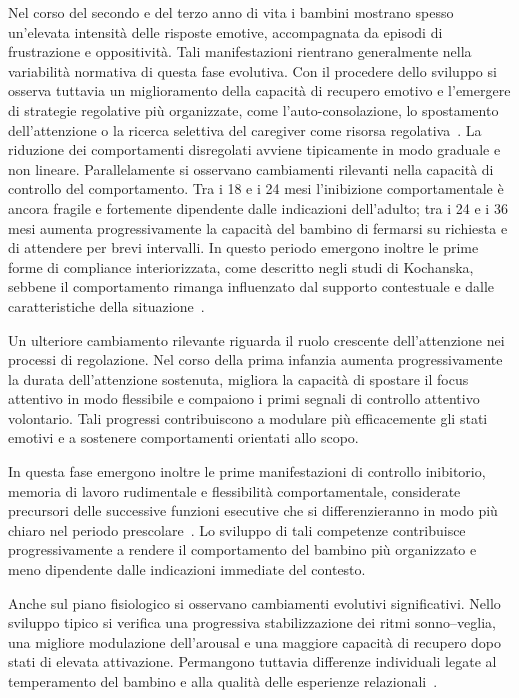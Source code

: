             Nel corso del secondo e del terzo anno di vita i bambini mostrano spesso un'elevata intensità delle risposte emotive, accompagnata da episodi di frustrazione e oppositività. Tali manifestazioni rientrano generalmente nella variabilità normativa di questa fase evolutiva. Con il procedere dello sviluppo si osserva tuttavia un miglioramento della capacità di recupero emotivo e l'emergere di strategie regolative più organizzate, come l'auto-consolazione, lo spostamento dell'attenzione o la ricerca selettiva del caregiver come risorsa regolativa~\cite{calkins2007,calkins2011,eisenberg2010}. La riduzione dei comportamenti disregolati avviene tipicamente in modo graduale e non lineare. Parallelamente si osservano cambiamenti rilevanti nella capacità di controllo del comportamento. Tra i 18 e i 24 mesi l'inibizione comportamentale è ancora fragile e fortemente dipendente dalle indicazioni dell'adulto; tra i 24 e i 36 mesi aumenta progressivamente la capacità del bambino di fermarsi su richiesta e di attendere per brevi intervalli. In questo periodo emergono inoltre le prime forme di compliance interiorizzata, come descritto negli studi di Kochanska, sebbene il comportamento rimanga influenzato dal supporto contestuale e dalle caratteristiche della situazione~\cite{kochanska2001}.

            Un ulteriore cambiamento rilevante riguarda il ruolo crescente dell'attenzione nei processi di regolazione. Nel corso della prima infanzia aumenta progressivamente la durata dell'attenzione sostenuta, migliora la capacità di spostare il focus attentivo in modo flessibile e compaiono i primi segnali di controllo attentivo volontario. Tali progressi contribuiscono a modulare più efficacemente gli stati emotivi e a sostenere comportamenti orientati allo scopo.

            In questa fase emergono inoltre le prime manifestazioni di controllo inibitorio, memoria di lavoro rudimentale e flessibilità comportamentale, considerate precursori delle successive funzioni esecutive che si differenzieranno in modo più chiaro nel periodo prescolare~\cite{garon2008,diamond2013}. Lo sviluppo di tali competenze contribuisce progressivamente a rendere il comportamento del bambino più organizzato e meno dipendente dalle indicazioni immediate del contesto.

            Anche sul piano fisiologico si osservano cambiamenti evolutivi significativi. Nello sviluppo tipico si verifica una progressiva stabilizzazione dei ritmi sonno--veglia, una migliore modulazione dell'arousal e una maggiore capacità di recupero dopo stati di elevata attivazione. Permangono tuttavia differenze individuali legate al temperamento del bambino e alla qualità delle esperienze relazionali~\cite{calkins2007hill,rothbart2006}.

